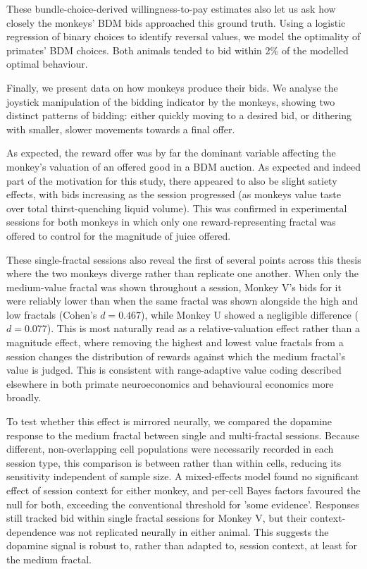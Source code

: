 These bundle-choice-derived willingness-to-pay estimates also let us ask how closely the monkeys' BDM bids approached this ground truth. Using a logistic regression of binary choices to identify reversal values, we model the optimality of primates' BDM choices. Both animals tended to bid within 2\% of the modelled optimal behaviour.

Finally, we present data on how monkeys produce their bids. We analyse the joystick manipulation of the bidding indicator by the monkeys, showing two distinct patterns of bidding: either quickly moving to a desired bid, or dithering with smaller, slower movements towards a final offer.

As expected, the reward offer was by far the dominant variable affecting the monkey's valuation of an offered good in a BDM auction. As expected and indeed part of the motivation for this study, there appeared to also be slight satiety effects, with bids increasing as the session progressed (as monkeys value taste over total thirst-quenching liquid volume). This was confirmed in experimental sessions for both monkeys in which only one reward-representing fractal was offered to control for the magnitude of juice offered.

These single-fractal sessions also reveal the first of several points across this thesis where the two monkeys diverge rather than replicate one another. When only the medium-value fractal was shown throughout a session, Monkey V's bids for it were reliably lower than when the same fractal was shown alongside the high and low fractals (Cohen's $d = 0.467$), while Monkey U showed a negligible difference ($d = 0.077$). This is most naturally read as a relative-valuation effect rather than a magnitude effect, where removing the highest and lowest value fractals from a session changes the distribution of rewards against which the medium fractal's value is judged. This is consistent with range-adaptive value coding described elsewhere in both primate neuroeconomics and behavioural economics more broadly.

To test whether this effect is mirrored neurally, we compared the dopamine response to the medium fractal between single and multi-fractal sessions. Because different, non-overlapping cell populations were necessarily recorded in each session type, this comparison is between rather than within cells, reducing its sensitivity independent of sample size. A mixed-effects model found no significant effect of session context for either monkey, and per-cell Bayes factors favoured the null for both, exceeding the conventional threshold for 'some evidence'. Responses still tracked bid within single fractal sessions for Monkey V, but their context-dependence was not replicated neurally in either animal. This suggests the dopamine signal is robust to, rather than adapted to, session context, at least for the medium fractal.

